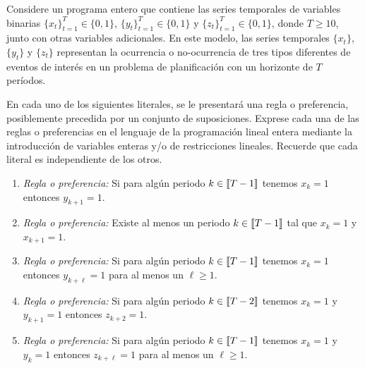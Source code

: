\documentclass[ a4paper, twoside, 11pt]{article}
\begin{document}
\begin{problem}
Considere un programa entero que contiene las series temporales de variables binarias $\{x_t\}_{t=1}^T \in \{ 0, 1 \}$, $\{y_t\}_{t=1}^T \in \{ 0, 1 \}$ y $\{z_t\}_{t=1}^T \in \{ 0, 1 \}$, donde $T \geq 10$, junto con otras variables adicionales. En este modelo, las series temporales $\{x_t\}$, $\{y_t\}$ y $\{z_t\}$ representan la ocurrencia o no-ocurrencia de tres tipos diferentes de eventos de inter\'es en un problema de planificaci\'on con un horizonte de $T$ per\'iodos. 

En cada uno de los siguientes literales, se le presentar\'a una regla o preferencia, posiblemente precedida por un conjunto de suposiciones. Exprese cada una de las reglas o preferencias en el lenguaje de la programaci\'on lineal entera mediante la introducci\'on de variables enteras y/o de restricciones lineales. Recuerde que cada literal es independiente de los otros. 
\begin{enumerate}[label=\alph*)]
\item \emph{Regla o preferencia:} Si para alg\'un periodo $k \in \llbracket T-1 \rrbracket$ tenemos $x_k = 1$ entonces $y_{k+1} = 1$. 

\item \emph{Regla o preferencia:} Existe al menos un periodo $k \in \llbracket T-1 \rrbracket$ tal que $x_k = 1$ y $x_{k+1} = 1$. 

\item \emph{Regla o preferencia:} Si para alg\'un periodo $k \in \llbracket T-1 \rrbracket$ tenemos $x_k = 1$ entonces $y_{k+\ell} = 1$ para al menos un $\ell \geq 1$. 

\item \emph{Regla o preferencia:} Si para alg\'un periodo $k \in \llbracket T-2 \rrbracket$ tenemos $x_k = 1$ y $y_{k+1} = 1$ entonces $z_{k+2} = 1$. 

\item \emph{Regla o preferencia:} Si para alg\'un periodo $k \in \llbracket T-1 \rrbracket$ tenemos $x_k = 1$ y $y_{k} = 1$ entonces $z_{k+ \ell} = 1$ para al menos un $\ell \geq 1$. 

\end{enumerate}
\QED

\end{problem}
\fullskip
\end{document}
